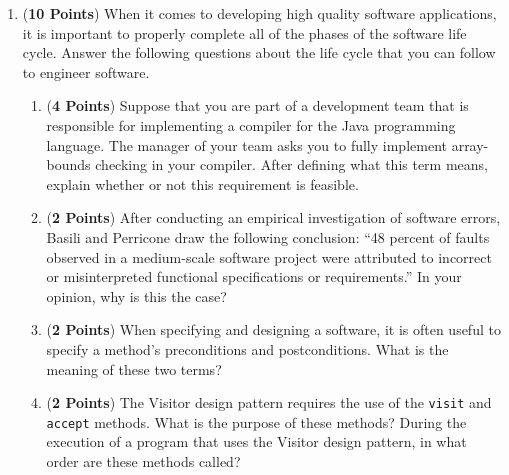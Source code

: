 \documentclass[12pt,epsf,psfig,graphicx]{article}
\begin{document}
\begin{enumerate}
\begin{enumerate}
\end{enumerate}

\newpage

\item ({\bf 10 Points}) When it comes to developing high quality software applications, it is important to properly
	complete all of the phases of the software life cycle.  Answer the following questions about the life cycle that you
	can follow to engineer software.

\begin{enumerate}

\item ({\bf 4 Points}) Suppose that you are part of a development team that is responsible for implementing a compiler
	for the Java programming language.  The manager of your team asks you to fully implement array-bounds checking
	in your compiler.  After defining what this term means, explain whether or not this requirement is feasible.

\item ({\bf 2 Points}) After conducting an empirical investigation of software errors, Basili and Perricone draw the
	following conclusion: ``48 percent of faults observed in a medium-scale software project were attributed to
	incorrect or misinterpreted functional specifications or requirements.''  In your opinion, why is this the case?

\item ({\bf 2 Points}) When specifying and designing a software, it is often useful to specify a method's preconditions
	and postconditions. What is the meaning of these two terms?

\item ({\bf 2 Points}) The Visitor design pattern requires the use of the {\tt visit} and {\tt accept} methods.  What is
	the purpose of these methods? During the execution of a program that uses the Visitor design pattern, in what order
	are these methods called?




\end{enumerate}
\end{enumerate}
\end{document}
